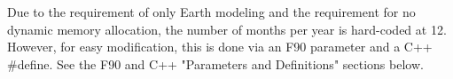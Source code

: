 
Due to the requirement of only Earth modeling and the requirement for no
dynamic memory allocation, the number of months per year is hard-coded
at 12.  However, for easy modification, this is done via an F90 parameter
and a C++ \#define.  See the F90 and C++ "Parameters and Definitions" sections
below.
